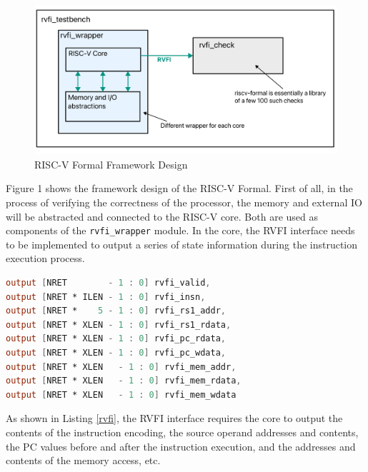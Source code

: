 \documentclass[conference]{IEEEtran}
\theoremstyle{definition}
\begin{document}
\begin{figure}[!htbp]
    \begin{center}
    \includegraphics[width=1\linewidth]{pics/riscvformal.pdf}
    \caption{RISC-V Formal Framework Design}
    \label{fig: riscvformal}
    \end{center}
\end{figure}
Figure 1 shows the framework design of the RISC-V Formal.
First of all, in the process of verifying the correctness of the processor, the memory and external IO will be abstracted and connected to the RISC-V core.
Both are used as components of the \verb|rvfi_wrapper| module.
In the core, the RVFI interface needs to be implemented to output a series of state information during the instruction execution process.

\begin{lstlisting}[language=verilog, caption={RVFI Definition (partial)}, label=rvfi]
output [NRET        - 1 : 0] rvfi_valid,
output [NRET * ILEN - 1 : 0] rvfi_insn,
output [NRET *    5 - 1 : 0] rvfi_rs1_addr,
output [NRET * XLEN - 1 : 0] rvfi_rs1_rdata,
output [NRET * XLEN - 1 : 0] rvfi_pc_rdata,
output [NRET * XLEN - 1 : 0] rvfi_pc_wdata,
output [NRET * XLEN   - 1 : 0] rvfi_mem_addr,
output [NRET * XLEN   - 1 : 0] rvfi_mem_rdata,
output [NRET * XLEN   - 1 : 0] rvfi_mem_wdata
\end{lstlisting}

As shown in Listing \ref{rvfi}, the RVFI interface requires the core to output the contents of the instruction encoding, the source operand addresses and contents, the PC values before and after the instruction execution, and the addresses and contents of the memory access, etc.
\end{document}
